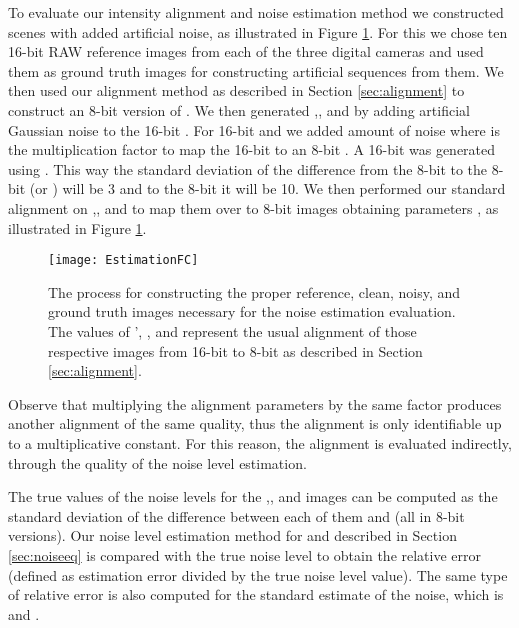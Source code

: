 \documentclass[review]{elsarticle}
\begin{document}
To evaluate our intensity alignment and noise estimation method we constructed scenes with added artificial noise, as illustrated in Figure \ref{fig:errorfc}. For this we chose ten 16-bit RAW reference images from each of the three digital cameras and used them as ground truth images  for constructing artificial sequences from them. We then used our alignment method as described in Section \ref{sec:alignment} to construct an 8-bit version of . We then generated ,, and  by adding artificial Gaussian noise to the 16-bit . For 16-bit  and  we added  amount of noise where  is the multiplication factor to map the 16-bit  to an 8-bit . A 16-bit  was generated using . This way the standard deviation of the difference from the 8-bit  to the 8-bit   (or  ) will be 3 and to the 8-bit   it will be 10.
 We then performed our standard alignment on ,, and  to map them over to 8-bit images obtaining parameters , as illustrated in Figure \ref{fig:errorfc}. 
\begin{figure}[htb]
\centering
\vspace{-3mm}
\hspace{-1mm}\texttt{[image: EstimationFC]}
\vskip -4mm
\caption{The process for constructing the proper reference, clean, noisy, and ground truth images necessary for the noise estimation evaluation. The values of ', , and  represent the usual alignment of those respective images from 16-bit to 8-bit as described in Section \ref{sec:alignment}.}
\vspace{-4mm}
\label{fig:errorfc}
\end{figure}






Observe that multiplying the alignment parameters  by the same factor produces another alignment of the same quality, thus the alignment is only identifiable up to a multiplicative constant. For this reason, the alignment is evaluated indirectly, through the quality of the noise level estimation. 

The true values of the noise levels for the ,, and  images can be computed as the standard deviation of the difference between each of them and  (all in 8-bit versions). 
Our noise level estimation method for  and  described in Section \ref{sec:noiseeq} is compared with the true noise level to obtain the relative error  (defined as estimation error divided by the true noise level value). The same type of relative error is also computed for the standard estimate of the noise, which is  and .
\end{document}
